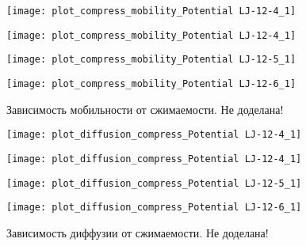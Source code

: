 \begin{figure}[h]
\begin{center}
\begin{minipage}[h]{0.45\linewidth}
\texttt{[image: plot\_compress\_mobility\_Potential LJ-12-4\_1]}
\end{minipage}
\begin{minipage}[h]{0.45\linewidth}
\texttt{[image: plot\_compress\_mobility\_Potential LJ-12-4\_1]}
\end{minipage}

\begin{minipage}[h]{0.45\linewidth}
\texttt{[image: plot\_compress\_mobility\_Potential LJ-12-5\_1]}
\end{minipage}
\begin{minipage}[h]{0.45\linewidth}
\texttt{[image: plot\_compress\_mobility\_Potential LJ-12-6\_1]}
\end{minipage}
\caption{Зависимость мобильности от сжимаемости. Не доделана!}
\label{risMuBeta}
\end{center}
\end{figure}


\begin{figure}[h]
\begin{center}
\begin{minipage}[h]{0.45\linewidth}
\texttt{[image: plot\_diffusion\_compress\_Potential LJ-12-4\_1]}
\end{minipage}
\begin{minipage}[h]{0.45\linewidth}
\texttt{[image: plot\_diffusion\_compress\_Potential LJ-12-4\_1]}
\end{minipage}

\begin{minipage}[h]{0.45\linewidth}
\texttt{[image: plot\_diffusion\_compress\_Potential LJ-12-5\_1]}
\end{minipage}
\begin{minipage}[h]{0.45\linewidth}
\texttt{[image: plot\_diffusion\_compress\_Potential LJ-12-6\_1]}
\end{minipage}
\caption{Зависимость диффузии от сжимаемости. Не доделана!}
\label{risDBeta}
\end{center}
\end{figure}



